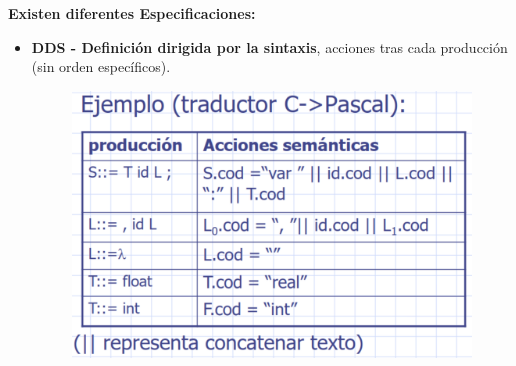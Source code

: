 \documentclass[12pt]{report} %
\begin{document}
\textbf{Existen diferentes Especificaciones:}
\begin{itemize}
  \item \textbf{DDS - Definición dirigida por la sintaxis}, acciones tras cada producción (sin orden específicos).
  
  \begin{figure}[H]
    {\includegraphics[scale=.3]{2021-04-21 10_49_57-05_resum_Sem_2021.pdf - Foxit Reader.png}}
  \end{figure}


\end{itemize}
\end{document}
